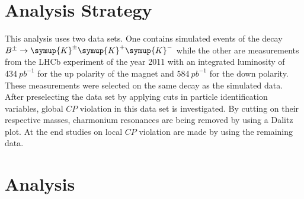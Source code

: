 \section{Analysis Strategy}
\label{sec:Analysis-Strategy}
This analysis uses two data sets.
One contains simulated events of the decay \mbox{$B^{\pm} \to \symup{K}^{\pm} \symup{K}^{+} \symup{K}^{-}$} while the other are measurements from the LHCb experiment of the year 2011 with an integrated luminosity of $\SI{434}{pb}^{-1}$ for the up polarity of the magnet and $\SI{584}{pb}^{-1}$ for the down polarity.
These measurements were selected on the same decay as the simulated data.
After preselecting the data set by applying cuts in particle identification variables, global $C\!P$ violation in this data set is investigated.
By cutting on their respective masses, charmonium resonances are being removed by using a Dalitz plot.
At the end studies on local $C\!P$ violation are made by using the remaining data.



\section{Analysis}
